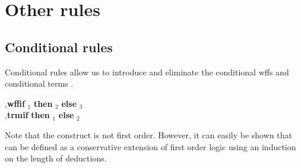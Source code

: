 \section{Other rules}

\subsection{Conditional rules}
\label{sec-cond}

Conditional rules allow us to introduce and eliminate the conditional wffs
{\wffif} and conditional terms {\termif}.

\begin{bnf}
	{\wffif}  \sep {\bf wffif} {\wff}$_1$ {\bf then} {\wff}$_2$ {\bf else}
				   {\wff}$_3$ \\
	{\termif} \sep {\bf trmif} {\wff} {\bf then} {\term}$_1$ {\bf else}
				   {\term}$_2$
\end{bnf}

Note that the {\termif} construct is not first order.
However, it can easily be shown that {\termif} can be defined as a conservative
extension of first order logic using an induction on the length of deductions.

